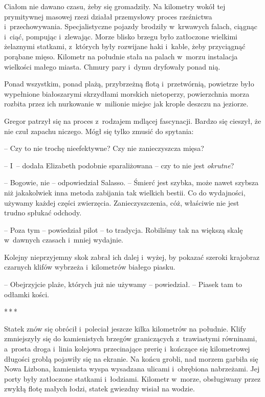 \documentclass[oneside,polish,12pt,sfheadings]{mwbk}
\newcommand{\threeast}{\bigskip\par\centerline{*\,*\,*}\medskip\par}%
\begin{document}
Ciałom nie dawano czasu, żeby się gromadziły. Na kilometry wokół tej
prymitywnej masowej rzezi działał przemysłowy proces rzeźnictwa i~przechowywania. Specjalistyczne pojazdy brodziły w~krwawych falach,
ciągnąc i~ciąć, pompując i~zlewając. Morze blisko brzegu było zatłoczone
wielkimi żelaznymi statkami, z~których były rozwijane haki i~kable, żeby
przyciągnąć porąbane mięso. Kilometr na południe stała na palach w~morzu
instalacja wielkości małego miasta. Chmury pary i~dymu dryfowały ponad
nią.

Ponad wszystkim, ponad plażą, przybrzeżną flotą i~przetwórnią, powietrze
było wypełnione białoszarymi skrzydłami morskich nietoperzy,
powierzchnia morza rozbita przez ich nurkowanie w~milionie miejsc jak
krople deszczu na jeziorze.

Gregor patrzył się na proces z~rodzajem mdlącej fascynacji. Bardzo się
cieszył, że nie czuł zapachu niczego. Mógł się tylko zmusić do spytania:

-- Czy to nie trochę nieefektywne? Czy nie zanieczyszcza mięsa?

-- I~-- dodała Elizabeth podobnie sparaliżowana -- czy to nie jest
\emph{okrutne}?

-- Bogowie, nie -- odpowiedział Salasso. -- Śmierć jest szybka, może nawet
szybsza niż jakakolwiek inna metoda zabijania tak wielkich bestii. Co do
wydajności, używamy każdej części zwierzęcia. Zanieczyszczenia, cóż,
właściwie nie jest trudno spłukać odchody.

-- Poza tym -- powiedział pilot -- to tradycja. Robiliśmy tak na większą
skalę w~dawnych czasach i~mniej wydajnie.

Kolejny nieprzyjemny skok zabrał ich dalej i~wyżej, by pokazać szeroki
krajobraz czarnych klifów wybrzeża i~kilometrów białego piasku.

-- Obejrzyjcie plaże, których już nie używamy -- powiedział. -- Piasek tam
to odłamki kości.

\threeast

Statek znów się obrócił i~poleciał jeszcze kilka kilometrów na południe.
Klify zmniejszyły się do kamienistych brzegów graniczących z~trawiastymi
równinami, a~prosta droga i~linia kolejowa przecinające prerię i~kończące się kilometrowej długości groblą pojawiły się na ekranie. Na
końcu grobli, nad morzem garbiła się Nowa Lizbona, kamienista wyspa
wysadzana ulicami i~obrębiona nabrzeżami. Jej porty były zatłoczone
statkami i~łodziami. Kilometr w~morze, obsługiwany przez zwykłą flotę
małych łodzi, statek gwiezdny wisiał na wodzie.
\end{document}
